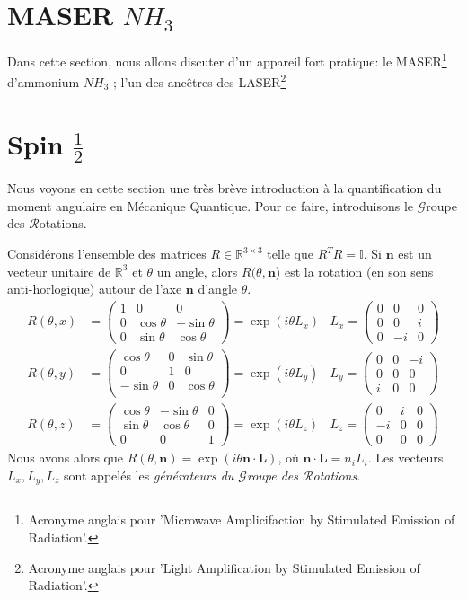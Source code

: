 \documentclass[../notesdecours.tex]{subfiles}
\begin{document}
\section{MASER $NH_3$}
Dans cette section, nous allons discuter d'un appareil fort pratique: le MASER\footnote{Acronyme anglais pour 'Microwave Amplicifaction by Stimulated Emission of Radiation'.} d'ammonium $NH_3$ ; l'un des ancêtres des LASER\footnote{Acronyme anglais pour 'Light Amplification by Stimulated Emission of Radiation'.}

\section{Spin $\frac{1}{2}$}
Nous voyons en cette section une très brève introduction à la quantification du moment angulaire en Mécanique Quantique. Pour ce faire, introduisons le $\mathcal{G}$roupe des $\mathcal{R}$otations.

Considérons l'ensemble des matrices $R \in \mathbb{R}^{3\times 3}$ telle que $R^TR = \mathbb{I}$. Si $\bm{n}$ est un vecteur unitaire de $\mathbb{R}^3$ et $\theta$ un angle, alors $R(\theta,\bm{n}$) est la rotation (en son sens anti-horlogique) autour de l'axe $\bm{n}$ d'angle $\theta$.
\begin{align*}
R(\theta,x) &= \begin{pmatrix}
1 & 0 & 0\\
0 & \cos\theta & -\sin\theta\\
0 & \sin\theta & \cos\theta
\end{pmatrix} = \exp (i\theta L_x)			&L_x = \begin{pmatrix}
0 & 0 & 0\\
0 & 0 & i\\
0 & -i & 0
\end{pmatrix}\\
R(\theta,y) &= \begin{pmatrix}
\cos\theta & 0 & \sin\theta\\
0 & 1 & 0\\
-\sin\theta & 0 & \cos\theta\\
\end{pmatrix} = \exp(i\theta L_y)		&L_y = \begin{pmatrix}
0 & 0 & -i\\
0 & 0 & 0\\
i & 0 & 0
\end{pmatrix}\\
R(\theta,z) &= \begin{pmatrix}
\cos\theta & -\sin\theta & 0\\
\sin\theta & \cos\theta & 0\\
0 & 0 & 1
\end{pmatrix} = \exp(i\theta L_z)		&L_z = \begin{pmatrix}
0 & i & 0\\
-i & 0 & 0\\
0 & 0 & 0
\end{pmatrix}
\end{align*}
Nous avons alors que $R(\theta,\bm{n}) = \exp (i\theta\bm{n}\cdot\bm{L})$, où $\bm{n}\cdot\bm{L} = n_iL_i$. Les vecteurs $L_x,L_y,L_z$ sont appelés les \emph{générateurs du $\mathcal{G}$roupe des $\mathcal{R}$otations}.\\
\end{document}
